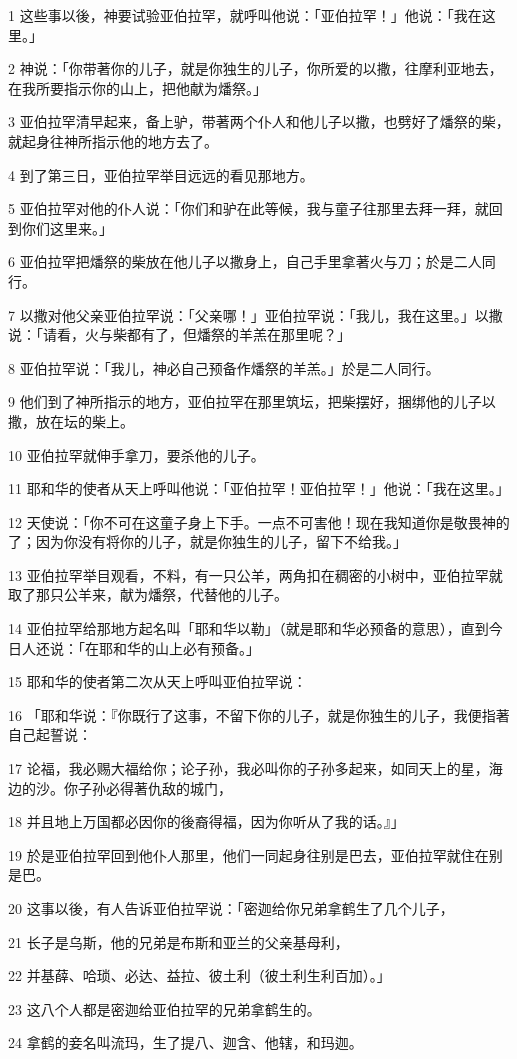 \par 1 这些事以後，神要试验亚伯拉罕，就呼叫他说：「亚伯拉罕！」他说：「我在这里。」
\par 2 神说：「你带著你的儿子，就是你独生的儿子，你所爱的以撒，往摩利亚地去，在我所要指示你的山上，把他献为燔祭。」
\par 3 亚伯拉罕清早起来，备上驴，带著两个仆人和他儿子以撒，也劈好了燔祭的柴，就起身往神所指示他的地方去了。
\par 4 到了第三日，亚伯拉罕举目远远的看见那地方。
\par 5 亚伯拉罕对他的仆人说：「你们和驴在此等候，我与童子往那里去拜一拜，就回到你们这里来。」
\par 6 亚伯拉罕把燔祭的柴放在他儿子以撒身上，自己手里拿著火与刀；於是二人同行。
\par 7 以撒对他父亲亚伯拉罕说：「父亲哪！」亚伯拉罕说：「我儿，我在这里。」以撒说：「请看，火与柴都有了，但燔祭的羊羔在那里呢？」
\par 8 亚伯拉罕说：「我儿，神必自己预备作燔祭的羊羔。」於是二人同行。
\par 9 他们到了神所指示的地方，亚伯拉罕在那里筑坛，把柴摆好，捆绑他的儿子以撒，放在坛的柴上。
\par 10 亚伯拉罕就伸手拿刀，要杀他的儿子。
\par 11 耶和华的使者从天上呼叫他说：「亚伯拉罕！亚伯拉罕！」他说：「我在这里。」
\par 12 天使说：「你不可在这童子身上下手。一点不可害他！现在我知道你是敬畏神的了；因为你没有将你的儿子，就是你独生的儿子，留下不给我。」
\par 13 亚伯拉罕举目观看，不料，有一只公羊，两角扣在稠密的小树中，亚伯拉罕就取了那只公羊来，献为燔祭，代替他的儿子。
\par 14 亚伯拉罕给那地方起名叫「耶和华以勒」（就是耶和华必预备的意思），直到今日人还说：「在耶和华的山上必有预备。」
\par 15 耶和华的使者第二次从天上呼叫亚伯拉罕说：
\par 16 「耶和华说：『你既行了这事，不留下你的儿子，就是你独生的儿子，我便指著自己起誓说：
\par 17 论福，我必赐大福给你；论子孙，我必叫你的子孙多起来，如同天上的星，海边的沙。你子孙必得著仇敌的城门，
\par 18 并且地上万国都必因你的後裔得福，因为你听从了我的话。』」
\par 19 於是亚伯拉罕回到他仆人那里，他们一同起身往别是巴去，亚伯拉罕就住在别是巴。
\par 20 这事以後，有人告诉亚伯拉罕说：「密迦给你兄弟拿鹤生了几个儿子，
\par 21 长子是乌斯，他的兄弟是布斯和亚兰的父亲基母利，
\par 22 并基薛、哈琐、必达、益拉、彼土利（彼土利生利百加）。」
\par 23 这八个人都是密迦给亚伯拉罕的兄弟拿鹤生的。
\par 24 拿鹤的妾名叫流玛，生了提八、迦含、他辖，和玛迦。

